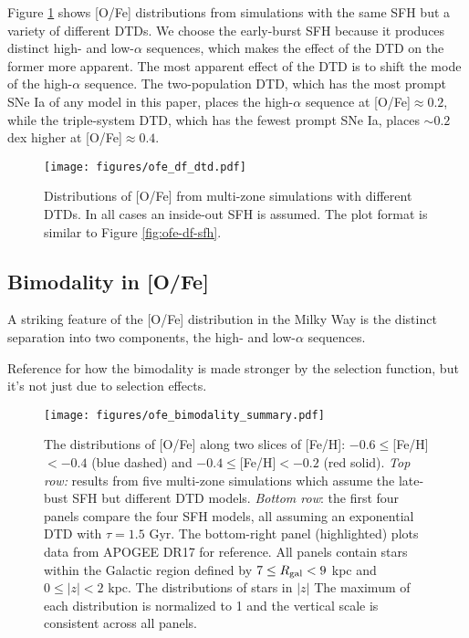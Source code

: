 \documentclass[modern,linenumbers]{aastex631}
\begin{document}
Figure \ref{fig:ofe-df-dtd} shows [O/Fe] distributions from simulations with the same SFH but a variety of different DTDs. We choose the early-burst SFH because it produces distinct high- and low-$\alpha$ sequences, which makes the effect of the DTD on the former more apparent. The most apparent effect of the DTD is to shift the mode of the high-$\alpha$ sequence. The two-population DTD, which has the most prompt SNe Ia of any model in this paper, places the high-$\alpha$ sequence at [O/Fe]$\approx 0.2$, while the triple-system DTD, which has the fewest prompt SNe Ia, places $\sim0.2$ dex higher at [O/Fe]$\approx0.4$.

\begin{figure*}
    \centering
    \texttt{[image: figures/ofe\_df\_dtd.pdf]}
    \caption{Distributions of [O/Fe] from multi-zone simulations with different DTDs. In all cases an inside-out SFH is assumed. The plot format is similar to Figure \ref{fig:ofe-df-sfh}.}
    \label{fig:ofe-df-dtd}
\end{figure*}

\subsection{Bimodality in [O/Fe]}
\label{sec:bimodality}

A striking feature of the [O/Fe] distribution in the Milky Way is the distinct separation into two components, the high- and low-$\alpha$ sequences. 

Reference \citet{Vincenzo2021-AlphaDistribution} for how the bimodality is made stronger by the selection function, but it's not just due to selection effects.

\begin{figure*}
    \centering
    \texttt{[image: figures/ofe\_bimodality\_summary.pdf]}
    \caption{The distributions of [O/Fe] along two slices of [Fe/H]: $-0.6\leq$[Fe/H]$<-0.4$ (blue dashed) and $-0.4\leq$[Fe/H]$<-0.2$ (red solid). \textit{Top row:} results from five multi-zone simulations which assume the late-bust SFH but different DTD models. \textit{Bottom row}: the first four panels compare the four SFH models, all assuming an exponential DTD with $\tau=1.5$ Gyr. The bottom-right panel (highlighted) plots data from APOGEE DR17 for reference. All panels contain stars within the Galactic region defined by $7\leq R_{\rm gal}<9$ kpc and $0\leq|z|<2$ kpc. The distributions of stars in $|z|$ The maximum of each distribution is normalized to 1 and the vertical scale is consistent across all panels.}
    \label{fig:ofe-bimodality}
\end{figure*}
\end{document}
